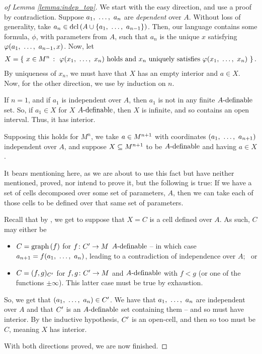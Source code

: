 \begin{proof}[of Lemma \ref{lemma:indep_top}]
  We start with the easy direction, and use a proof by contradiction. Suppose $\vonevm{a}{n}$ are \emph{dependent} over $A$. Without loss of generality, take $a_n \in \dcl{A \cup \{ \vonevm{a}{n-1} \}}$. Then, our language contains some formula, $\phi$, with parameters from $A$, such that $a_n$ is the unique $x$ satisfying $\phi(\vonevm{a}{n-1}, x)$. Now, let
    \begin{align*}
      X = \left\{ \ \aMn[x]{n} \ \colon \ \phi(\vonevm{x}{n}) \textrm{ holds and } x_n \textrm{ uniquely satisfies } \phi(\vonevm{x}{n}) \ \right\}.
    \end{align*}
  By uniqueness of $x_n$, we must have that $X$ has an empty interior and $a \in X$. Now, for the other direction, we use \cd by induction on $n$.

  If $n = 1$, and if $a_1$ is independent over $A$, then $a_1$ is not in any finite $\Adefnb$ set. So, if $a_1 \in X$ for $X$ $\Adefnb$, then $X$ is infinite, and so contains an open interval. Thus, it has \inhb interior.

  Supposing this holds for $M^n$, we take $\aMn[a]{n+1}$ with coordinates $(\vonevm{a}{n+1})$ independent over $A$, and suppose $\XMn[X]{n+1}$ to be $\Adefnb$ and having $a \in X$.
  \begin{svgraybox}
    It bears mentioning here, as we are about to use this fact but have neither mentioned, proved, nor intend to prove it, but the following is true: If we have a set of cells decomposed over some set of parameters, $A$, then we can take each of those cells to be defined over that same set of parameters.
  \end{svgraybox}
  Recall that by \cd, we get to suppose that $X = C$ is a cell defined over $A$. As such, $C$ may either be
    \begin{itemize}
      \item $C = \graph{f}$ for $\funcdom{f}{\pri{C}}{M}$ $\Adefnb$ -- in which case $a_{n+1} = f(\vonevm{a}{n})$, leading to a contradiction of independence over $A$; \ or

      \item $C = (f, g)_{\pri{C}}$ for $\funcdom{f,g}{\pri{C}}{M}$ \cont and $\Adefnb$ with $f < g$ (or one of the functions $\pm \infty$). This latter case must be true by exhaustion.
    \end{itemize}
  So, we get that $(\vonevm{a}{n}) \in \pri{C}$. We have that $\vonevm{a}{n}$ are independent over $A$ and that $\pri{C}$ is an $\Adefnb$ set containing them -- and so must have interior. By the inductive hypothesis, $\pri{C}$ is an open-cell, and then so too must be $C$, meaning $X$ has \inhb interior.

  With both directions proved, we are now finished.
  \smartqed
\end{proof}

